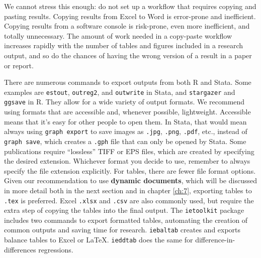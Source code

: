 We cannot stress this enough:
do not set up a workflow that requires copying and pasting results.
Copying results from Excel to Word is error-prone and inefficient.
Copying results from a software console is risk-prone,
even more inefficient, and totally unnecessary.
The amount of work needed in a copy-paste workflow increases
rapidly with the number of tables and figures included in a research output,
and so do the chances of having the wrong version of a result in a paper or report.

There are numerous commands to export outputs from both R and Stata.
Some examples are \texttt{estout},\cite{estout05, estout07}
\texttt{outreg2},
and \texttt{outwrite} in Stata,
and \texttt{stargazer}
and \texttt{ggsave} in R.
They allow for a wide variety of output formats. We recommend using formats that are accessible and, whenever possible, lightweight.
Accessible means that it's easy for other people to open them.
In Stata, that would mean always using \texttt{graph export} to save images as
\texttt{.jpg}, \texttt{.png}, \texttt{.pdf}, etc.,
instead of \texttt{graph save},
which creates a \texttt{.gph} file that can only be opened by Stata.
Some publications require ``lossless'' TIFF or EPS files, 
which are created by specifying the desired extension.
Whichever format you decide to use, 
remember to always specify the file extension explicitly.
For tables, there are fewer file format options.
Given our recommendation to use \textbf{dynamic documents},
which will be discussed in more detail both in the next section and in chapter \ref{ch:7},
exporting tables to \texttt{.tex} is preferred.
Excel \texttt{.xlsx} and \texttt{.csv} are also commonly used,
but require the extra step of copying the tables into the final output.
The \texttt{ietoolkit} package includes two commands to export formatted tables,
automating the creation of common outputs and saving time for research.
\texttt{iebaltab}
creates and exports balance tables to Excel or {\LaTeX}.
\texttt{ieddtab}
does the same for difference-in-differences regressions.

